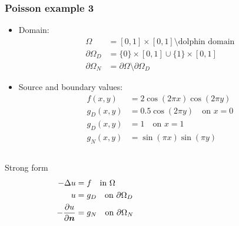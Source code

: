 \begin{frame}[shrink=20]
  \frametitle{Poisson example 3}
    \begin{itemize}
      \item Domain: \vspace{-1em}
        \begin{align*}
            \Omega &= [0,1]\times[0,1] \setminus \text{dolphin domain} \\
        \partial \Omega_D &= \{0\} \times [0,1] \cup \{1\} \times
        [0,1]
        \\
        \partial \Omega_N &= \partial \Omega \setminus \partial
        \Omega_D
        \end{align*}
      \item  Source and boundary values: 
        \vspace{-0.5em}
        \begin{align*}
          f(x,y) &= 2\cos(2\pi x)\cos(2\pi y) 
          \\
          g_D(x,y) &= 0.5 \cos(2\pi y) \quad \text{on } x = 0 \\
          g_D(x,y) &= 1 \quad \text{on } x = 1 \\
          g_N(x,y) &= \sin(\pi x)\sin(\pi y)
        \end{align*}
    \end{itemize}
    \vspace{-1em}
    \begin{columns}[t]
      \begin{column}{0.4\textwidth}
        \begin{block}{Strong form}
          \vspace{-2em}
          \begin{align*}
            -\Delta u &= f \quad \text{in } \Omega \\
                    u &= g_D \quad \text{on } \partial \Omega_D \\
              -\dfrac{\partial u}{\partial \boldsymbol{n}} &= g_N \quad \text{on }
            \partial \Omega_N
          \end{align*}
        \end{block}
      \end{column}
      \begin{column}{0.6\textwidth}
\end{column}
\end{columns}
\end{frame}
